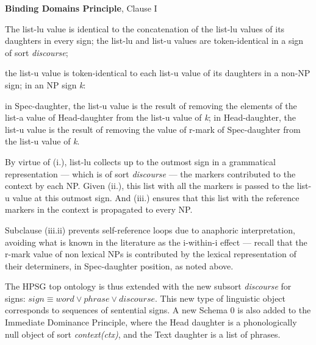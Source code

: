 \documentclass[output=paper
,modfonts
,nonflat]{langsci/langscibook}
\begin{document}
\begin{exe}
\ex\label{bdp}
\textbf{Binding Domains Principle}, Clause I
\begin{xlisti}
\ex The {\sc list-lu} value is identical to the 
concatenation of the {\sc list-lu} values of its daughters in every sign;
\ex  the {\sc list-lu} and {\sc list-u} values are 
token-identical in a sign of sort {\it discourse};
\ex
\begin{xlisti}
\ex  the {\sc list-u} value is token-identical to each 
{\sc list-u} value of its daughters in a non-NP sign;
\ex in an NP sign {\it k}:

\begin{itemize}
\ex in Spec-daughter, the {\sc list-u} value is the result of removing the 
elements of the {\sc list-a} value of Head-daughter from the {\sc list-u} value of {\it k};
\ex in Head-daughter, the {\sc list-u} value is the result of removing 
the value of {\sc r-mark} of Spec-daughter from the {\sc list-u} value of {\it k}.
\end{itemize}

\end{xlisti}
\end{xlisti}
\end{exe}


\noindent By virtue of (i.), {\sc list-lu} collects up to the outmost sign in a grammatical 
representation --- which is of sort {\it discourse} --- the markers contributed to the context
by each NP. Given (ii.), this list with all the markers is passed to the
{\sc list-u} value at this outmost sign. And (iii.) ensures that this
list with the reference markers in the context is propagated to every NP. 

Subclause (iii.ii) prevents self-reference loops
due to anaphoric interpretation, avoiding what is known 
in the literature as the i-within-i effect --- recall that the {\sc r-mark} value of non lexical NPs 
is contributed by the 
lexical representation of their determiners, in Spec-daughter 
position, as noted above.

The HPSG top ontology is thus extended with the new subsort {\it discourse} 
for signs: $sign \equiv word \vee phrase \vee discourse$. This new type of 
linguistic object corresponds to sequences of sentential signs.
A new Schema 0 is also added to the
Immediate Dominance Principle, where the Head daughter is a 
phonologically null object of sort {\em context(ctx)}, and the Text daughter 
is a list of phrases. 
\end{document}
